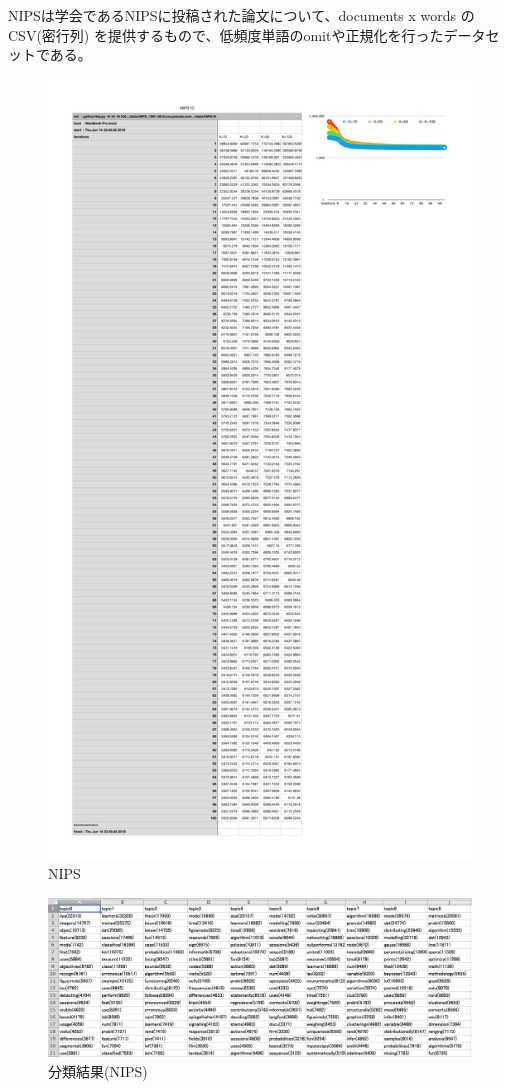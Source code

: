 \documentclass[uplatex,dvipdfmx]{jsarticle}
\begin{document}
NIPSは学会であるNIPSに投稿された論文について、documents x words のCSV(密行列)
を提供するもので、低頻度単語のomitや正規化を行ったデータセットである。
\begin{figure}[t]
\includegraphics[width=13cm,pagebox=cropbox]{NIPS.pdf}
\caption{NIPS}
\end{figure}

\begin{figure}[ht]
\includegraphics[width=16cm]{NIPS10.png}
\caption{分類結果(NIPS)}
\end{figure}
\end{document}
